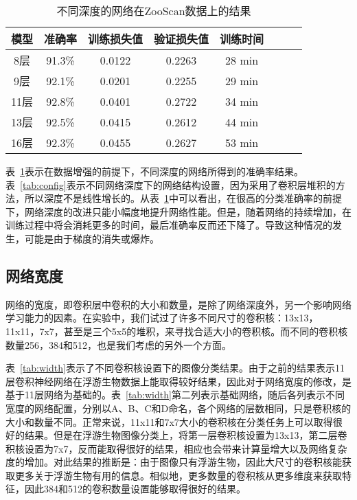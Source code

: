 \begin{table}[H]
\centering
\caption{不同深度的网络在ZooScan数据上的结果}
\label{tab:dep}
\begin{tabular}{|c|c|c|c|c|c|c|c|}
\hline 模型 & 准确率 & 训练损失值 & 验证损失值 & 训练时间\\ 
\hline 8层 & 91.3\% & 0.0122 & 0.2263 & 28 min \\
\hline 9层 & 92.1\% & 0.0201 & 0.2255 & 29 min \\
\hline 11层 & 92.8\% & 0.0401 & 0.2722 & 34 min \\
\hline 13层 & 92.5\% & 0.0415 & 0.2612 & 44 min  \\
\hline 16层 & 92.3\% & 0.0455 & 0.2627 & 53 min  \\
\hline
\end{tabular}
\end{table}

表~\ref{tab:dep}表示在数据增强的前提下，不同深度的网络所得到的准确率结果。表~\ref{tab:config}表示不同网络深度下的网络结构设置，因为采用了卷积层堆积的方法，所以深度不是线性增长的。从表~\ref{tab:dep}中可以看出，在很高的分类准确率的前提下，网络深度的改进只能小幅度地提升网络性能。但是，随着网络的持续增加，在训练过程中将会消耗更多的时间，最后准确率反而还下降了。导致这种情况的发生，可能是由于梯度的消失或爆炸。


\subsection{网络宽度}
网络的宽度，即卷积层中卷积的大小和数量，是除了网络深度外，另一个影响网络学习能力的因素。在实验中，我们试过了许多不同尺寸的卷积核：13x13，11x11，7x7，甚至是三个5x5的堆积，来寻找合适大小的卷积核。而不同的卷积核数量256，384和512，也是我们考虑的另外一个方面。

表~\ref{tab:width}表示了不同卷积核设置下的图像分类结果。由于之前的结果表示11层卷积神经网络在浮游生物数据上能取得较好结果，因此对于网络宽度的修改，是基于11层网络为基础的。表~\ref{tab:width}第二列表示基础网络，随后各列表示不同宽度的网络配置，分别以A、B、C和D命名，各个网络的层数相同，只是卷积核的大小和数量不同。正常来说，11x11和7x7大小的卷积核在分类任务上可以取得很好的结果。但是在浮游生物图像分类上，将第一层卷积核设置为13x13，第二层卷积核设置为7x7，反而能取得很好的结果，相应也会带来计算量增大以及网络复杂度的增加。对此结果的推断是：由于图像只有浮游生物，因此大尺寸的卷积核能获取更多关于浮游生物有用的信息。相似地，更多数量的卷积核从更多维度来获取特征，因此384和512的卷积数量设置能够取得很好的结果。


